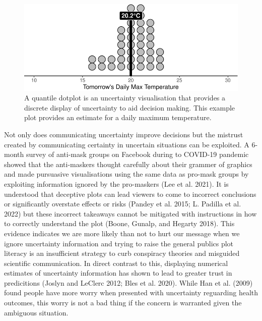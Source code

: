 \documentclass[
  letterpaper,
  DIV=11,
  numbers=noendperiod]{scrartcl}
\begin{document}
\begin{figure}

{\centering \includegraphics{confirmationreport_files/figure-pdf/fig-quantdot-1.pdf}

}

\caption{\label{fig-quantdot}A quantile dotplot is an uncertainty
visualisation that provides a discrete display of uncertainty to aid
decision making. This example plot provides an estimate for a daily
maximum temperature.}

\end{figure}

Not only does communicating uncertainty improve decisions but the
mistrust created by communicating certainty in uncertain situations can
be exploited. A 6-month survey of anti-mask groups on Facebook during to
COVID-19 pandemic showed that the anti-maskers thought carefully about
their grammer of graphics and made pursuasive visualisations using the
same data as pro-mask groups by exploiting information ignored by the
pro-maskers (Lee et al. 2021). It is understood that deceptive plots can
lead viewers to come to incorrect conclusions or significantly overstate
effects or risks (Pandey et al. 2015; L. Padilla et al. 2022) but these
incorrect takeaways cannot be mitigated with instructions in how to
correctly understand the plot (Boone, Gunalp, and Hegarty 2018). This
evidence indicates we are more likely than not to hurt our message when
we ignore uncertainty information and trying to raise the general
publics plot literacy is an insufficient strategy to curb conspiracy
theories and misguided scientific communication. In direct contrast to
this, displaying numerical estimates of uncertainty information has
shown to lead to greater trust in predicitions (Joslyn and LeClerc 2012;
Bles et al. 2020). While Han et al. (2009) found people have more worry
when presented with uncertainty reguarding health outcomes, this worry
is not a bad thing if the concern is warranted given the ambiguous
situation.
\end{document}
